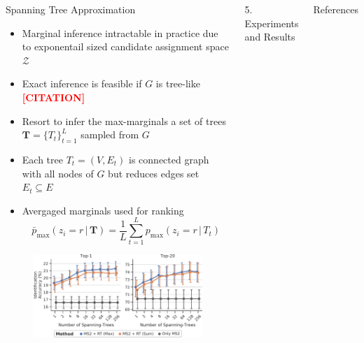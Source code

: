 \documentclass{beamer}
\newcommand{\todocite}{\textcolor{red}{\textbf{[CITATION]}}}
\begin{document}
\begin{frame}{}
\begin{columns}[T]

    \begin{block}{{\normalsize Spanning Tree Approximation}}
    \begin{itemize}
        \item Marginal inference intractable in practice due to exponentail sized candidate assignment space $\mathcal{Z}$
        \item Exact inference is feasible if $G$ is tree-like \todocite
        \item Resort to infer the max-marginals a set of trees $\mathbf{T}=\{T_t\}_{t=1}^L$ sampled from $G$
        \item Each tree $T_t=(V,E_t)$ is connected graph with all nodes of $G$ but reduces edges set $E_t\subseteq E$
        \item Avergaged marginals used for ranking
            \begin{equation}
                \bar{p}_{\max}(z_i=r\,|\,\mathbf{T})=\frac{1}{L}\sum_{t=1}^L p_{\max}(z_i=r\,|\,T_t)
            \end{equation}
    \end{itemize}
    \begin{figure}
        \centering
        \includegraphics[width=\textwidth]{images/number_of_random_spanning_trees.pdf}
    \end{figure}
    \end{block}


    \begin{block}{{\normalsize 5. Experiments and Results}}
    \end{block}



\vfill

\begin{block}{\small References}
\end{block}

\end{columns}

\vfill

\end{frame}
\end{document}
